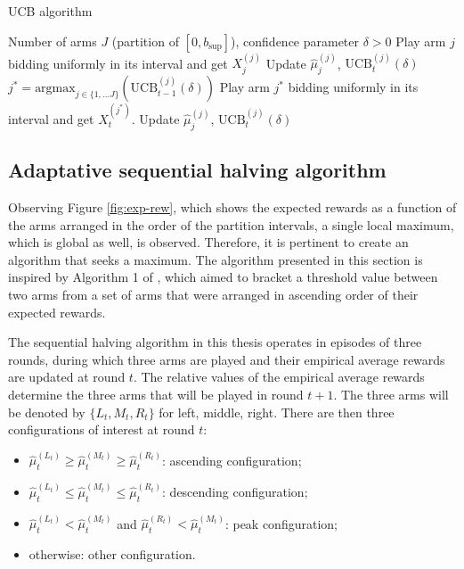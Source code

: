 \documentclass{statsmsc}
\begin{document}
\begin{algorithm}[H]
  \caption{UCB algorithm}
  \label{code:UCB}
  \begin{algorithmic}[0]
  \Require Number of arms $J$ (partition of $[0, b_{\sup}]$), confidence parameter $\delta>0$
   
  \State Play arm $j$ bidding uniformly in its interval and get $X_j^{(j)}$
  \State Update $\hat{\mu}^{(j)}_j$, $\text{UCB}^{(j)}_t(\delta)$
  \EndFor
  \State $j^* = \text{argmax}_{j \in \{1, \dots J\}} (\text{UCB}^{(j)}_{t-1}(\delta))$
  \State Play arm $j^*$ bidding uniformly in its interval and get $X_t^{(j^*)}$.
  \State Update $\hat{\mu}^{(j)}_j$, $\text{UCB}^{(j)}_t(\delta)$
  \EndFor 
\end{algorithmic}
\end{algorithm}

\subsection{Adaptative sequential halving algorithm}

Observing Figure \ref{fig:exp-rew}, which shows the expected rewards as a function of the arms arranged in the order of the partition intervals, a single local maximum, which is global as well, is observed. Therefore, it is pertinent to create an algorithm that seeks a maximum. The algorithm presented in this section is inspired
by Algorithm 1 of \cite{pmlr-v139-cheshire21a}, which aimed to bracket a threshold value between two arms from a set of arms that were arranged in ascending order of their expected rewards.

The sequential halving algorithm in this thesis operates in episodes of three rounds, during which three arms are played and their empirical average rewards are updated at round $t$. The relative values of the empirical average rewards determine the three arms that will be played in round $t+1$.
The three arms will be denoted by $\{L_t, M_t, R_t\}$ for left, middle, right. There are then three configurations of interest at round $t$:
\begin{itemize}
  \item $\hat{\mu}_t^{(L_t)} \geq \hat{\mu}_t^{(M_t)} \geq \hat{\mu}_t^{(R_t)}$: ascending configuration;
  \item $\hat{\mu}_t^{(L_t)} \leq \hat{\mu}_t^{(M_t)} \leq \hat{\mu}_t^{(R_t)}$: descending configuration;
  \item $\hat{\mu}_t^{(L_t)} < \hat{\mu}_t^{(M_t)}$ and $\hat{\mu}_t^{(R_t)} < \hat{\mu}_t^{(M_t)}$: peak configuration;
  \item otherwise: other configuration. 
\end{itemize}
\end{document}
